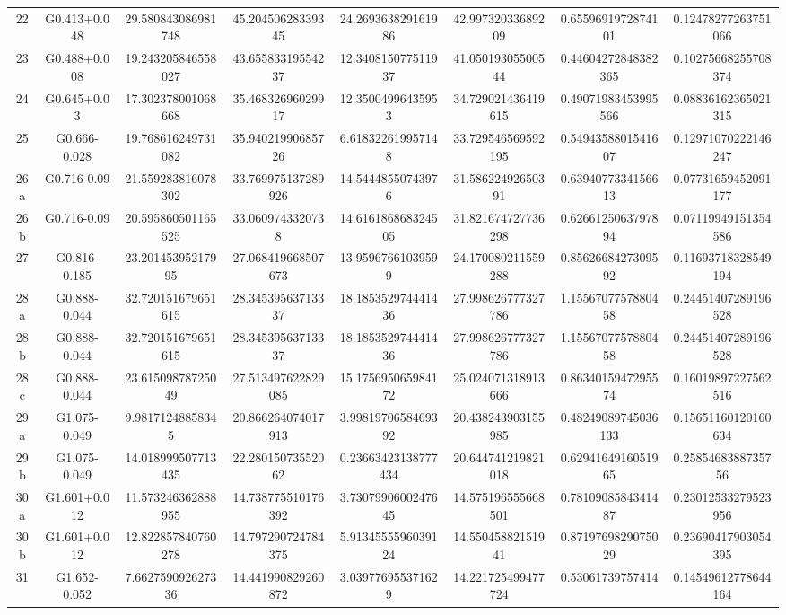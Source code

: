\begin{table}
\begin{tabular}{cccccccc}
22 & G0.413+0.048 & 29.580843086981748 & 45.20450628339345 & 24.269363829161986 & 42.99732033689209 & 0.6559691972874101 & 0.12478277263751066 \\
23 & G0.488+0.008 & 19.243205846558027 & 43.65583319554237 & 12.340815077511937 & 41.05019305500544 & 0.44604272848382365 & 0.10275668255708374 \\
24 & G0.645+0.03 & 17.302378001068668 & 35.46832696029917 & 12.35004996435953 & 34.729021436419615 & 0.49071983453995566 & 0.08836162365021315 \\
25 & G0.666-0.028 & 19.768616249731082 & 35.94021990685726 & 6.618322619957148 & 33.729546569592195 & 0.5494358801541607 & 0.12971070222146247 \\
26a & G0.716-0.09 & 21.559283816078302 & 33.769975137289926 & 14.54448550743976 & 31.58622492650391 & 0.6394077334156613 & 0.07731659452091177 \\
26b & G0.716-0.09 & 20.595860501165525 & 33.0609743320738 & 14.616186868324505 & 31.821674727736298 & 0.6266125063797894 & 0.07119949151354586 \\
27 & G0.816-0.185 & 23.20145395217995 & 27.068419668507673 & 13.95967661039599 & 24.170080211559288 & 0.8562668427309592 & 0.11693718328549194 \\
28a & G0.888-0.044 & 32.720151679651615 & 28.34539563713337 & 18.185352974441436 & 27.998626777327786 & 1.1556707757880458 & 0.24451407289196528 \\
28b & G0.888-0.044 & 32.720151679651615 & 28.34539563713337 & 18.185352974441436 & 27.998626777327786 & 1.1556707757880458 & 0.24451407289196528 \\
28c & G0.888-0.044 & 23.61509878725049 & 27.513497622829085 & 15.175695065984172 & 25.024071318913666 & 0.8634015947295574 & 0.16019897227562516 \\
29a & G1.075-0.049 & 9.98171248858345 & 20.866264074017913 & 3.9981970658469392 & 20.438243903155985 & 0.48249089745036133 & 0.15651160120160634 \\
29b & G1.075-0.049 & 14.018999507713435 & 22.28015073552062 & 0.23663423138777434 & 20.644741219821018 & 0.6294164916051965 & 0.2585468388735756 \\
30a & G1.601+0.012 & 11.573246362888955 & 14.738775510176392 & 3.7307990600247645 & 14.575196555668501 & 0.7810908584341487 & 0.23012533279523956 \\
30b & G1.601+0.012 & 12.822857840760278 & 14.797290724784375 & 5.9134555596039124 & 14.55045882151941 & 0.8719769829075029 & 0.23690417903054395 \\
31 & G1.652-0.052 & 7.662759092627336 & 14.441990829260872 & 3.039776955371629 & 14.221725499477724 & 0.53061739757414 & 0.14549612778644164 \\
\end{tabular}
\end{table}
